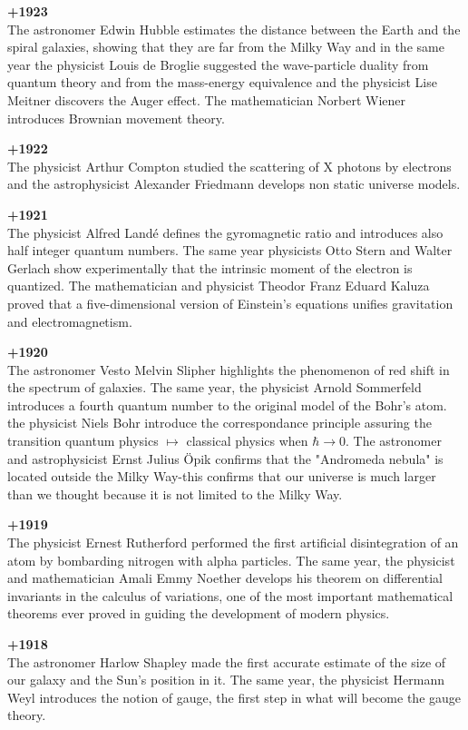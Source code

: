 \textbf{+1923}\\
The astronomer Edwin Hubble estimates the distance between the Earth and the spiral galaxies, showing that they are far from the Milky Way and in the same year the physicist Louis de Broglie suggested the wave-particle duality from quantum theory and from the mass-energy equivalence and the physicist Lise Meitner discovers the Auger effect. The mathematician Norbert Wiener introduces Brownian movement theory.

\textbf{+1922}\\
The physicist Arthur Compton studied the scattering of X photons by electrons and the astrophysicist Alexander Friedmann develops non static universe models.

\textbf{+1921}\\
The physicist Alfred Landé defines the gyromagnetic ratio and introduces also half integer quantum numbers. The same year physicists Otto Stern and Walter Gerlach show experimentally that the intrinsic moment of the electron is quantized. The mathematician and physicist Theodor Franz Eduard Kaluza proved that a five-dimensional version of Einstein's equations unifies gravitation and electromagnetism.

\textbf{+1920}\\
The astronomer Vesto Melvin Slipher highlights the phenomenon of red shift in the spectrum of galaxies. The same year, the physicist Arnold Sommerfeld introduces a fourth quantum number to the original model of the Bohr's atom. the physicist Niels Bohr introduce the correspondance principle assuring the transition quantum physics $\mapsto$ classical physics when $\hbar\rightarrow 0$. The astronomer and astrophysicist Ernst Julius Öpik confirms that the "Andromeda nebula" is located outside the Milky Way-this confirms that our universe is much larger than we thought because it is not limited to the Milky Way.

\textbf{+1919}\\
The physicist Ernest Rutherford performed the first artificial disintegration of an atom by bombarding nitrogen with alpha particles. The same year, the physicist and mathematician Amali Emmy Noether develops his theorem on differential invariants in the calculus of variations, one of the most important mathematical theorems ever proved in guiding the development of modern physics.

\textbf{+1918}\\
The astronomer Harlow Shapley made the first accurate estimate of the size of our galaxy and the Sun's position in it. The same year, the physicist Hermann Weyl introduces the notion of gauge, the first step in what will become the gauge theory.


